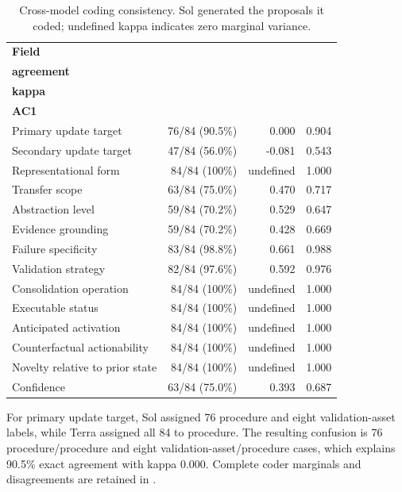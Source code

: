 \documentclass[10pt,twocolumn]{article}
\begin{document}
\begin{table}[!ht]
\caption{Cross-model coding consistency. Sol generated the proposals it coded; undefined kappa indicates zero marginal variance.}
\label{tab:coding-agreement}
\centering\tiny
\setlength{\tabcolsep}{2pt}
\begin{tabularx}{\columnwidth}{@{}Xrrr@{}}
\toprule
\textbf{Field} & \shortstack{\textbf{Exact}\\\textbf{agreement}} & \shortstack{\textbf{Cohen's}\\\textbf{kappa}} & \shortstack{\textbf{Gwet's}\\\textbf{AC1}}\\
\midrule
Primary update target & 76/84 (90.5\%) & 0.000 & 0.904\\
Secondary update target & 47/84 (56.0\%) & -0.081 & 0.543\\
Representational form & 84/84 (100\%) & undefined & 1.000\\
Transfer scope & 63/84 (75.0\%) & 0.470 & 0.717\\
Abstraction level & 59/84 (70.2\%) & 0.529 & 0.647\\
Evidence grounding & 59/84 (70.2\%) & 0.428 & 0.669\\
Failure specificity & 83/84 (98.8\%) & 0.661 & 0.988\\
Validation strategy & 82/84 (97.6\%) & 0.592 & 0.976\\
Consolidation operation & 84/84 (100\%) & undefined & 1.000\\
Executable status & 84/84 (100\%) & undefined & 1.000\\
Anticipated activation & 84/84 (100\%) & undefined & 1.000\\
Counterfactual actionability & 84/84 (100\%) & undefined & 1.000\\
Novelty relative to prior state & 84/84 (100\%) & undefined & 1.000\\
Confidence & 63/84 (75.0\%) & 0.393 & 0.687\\
\bottomrule
\end{tabularx}
\end{table}

For primary update target, Sol assigned 76 procedure and eight
validation-asset labels, while Terra assigned all 84 to procedure. The
resulting confusion is 76 procedure/procedure and eight
validation-asset/procedure cases, which explains 90.5\% exact agreement
with kappa 0.000. Complete coder marginals and disagreements are
retained in .
\end{document}
